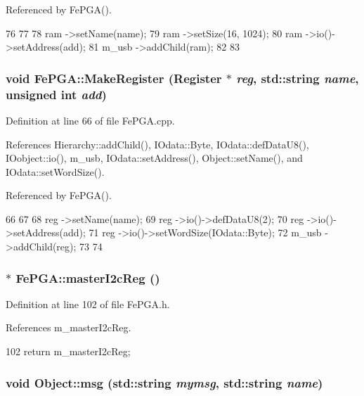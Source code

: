Referenced by FePGA().


\begin{DoxyCode}
76                                                              {
77 
78   ram   ->setName(name);
79   ram   ->setSize(16, 1024);        
80   ram   ->io()->setAddress(add);
81   m_usb ->addChild(ram);
82 
83 }
\end{DoxyCode}
\hypertarget{classFePGA_aa58fc0a09d8efa7abc2766bf5bb67327}{
\subsubsection[{MakeRegister}]{\setlength{\rightskip}{0pt plus 5cm}void FePGA::MakeRegister ({\bf Register} $\ast$ {\em reg}, \/  std::string {\em name}, \/  unsigned int {\em add})}}
\label{classFePGA_aa58fc0a09d8efa7abc2766bf5bb67327}


Definition at line 66 of file FePGA.cpp.

References Hierarchy::addChild(), IOdata::Byte, IOdata::defDataU8(), IOobject::io(), m\_\-usb, IOdata::setAddress(), Object::setName(), and IOdata::setWordSize().

Referenced by FePGA().


\begin{DoxyCode}
66                                                                        {
67 
68   reg   ->setName(name);
69   reg   ->io()->defDataU8(2);     
70   reg   ->io()->setAddress(add);
71   reg   ->io()->setWordSize(IOdata::Byte);
72   m_usb ->addChild(reg);
73 
74 }
\end{DoxyCode}
\hypertarget{classFePGA_a2bcd2c468fc3e1bcadc9bd8800b325a0}{
\subsubsection[{masterI2cReg}]{$\ast$ FePGA::masterI2cReg ()}}
\label{classFePGA_a2bcd2c468fc3e1bcadc9bd8800b325a0}


Definition at line 102 of file FePGA.h.

References m\_\-masterI2cReg.


\begin{DoxyCode}
102 { return m_masterI2cReg; }
\end{DoxyCode}
\hypertarget{classObject_ac5d59299273cee27aacf7de00d2e7034}{
\subsubsection[{msg}]{\setlength{\rightskip}{0pt plus 5cm}void Object::msg (std::string {\em mymsg}, \/  std::string {\em name})}}
\label{classObject_ac5d59299273cee27aacf7de00d2e7034}


